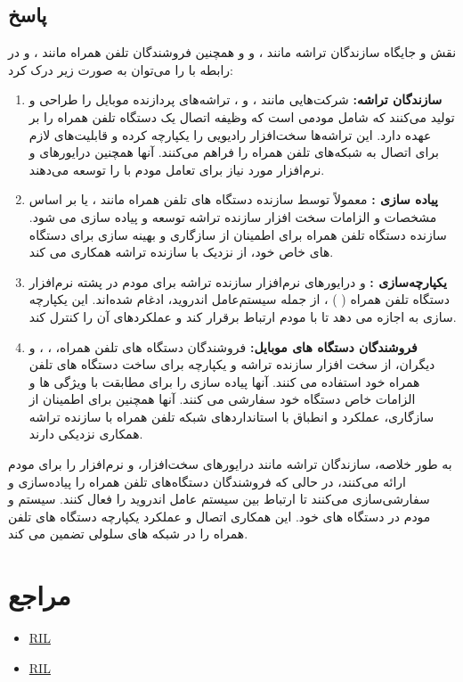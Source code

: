 \documentclass{report}
\begin{document}
\subsection*{پاسخ}
نقش و جایگاه سازندگان تراشه مانند
، 
و
 و همچنین فروشندگان تلفن همراه مانند
 ،
 و
  در رابطه با 
   را می‌توان به صورت زیر درک کرد:
\begin{enumerate}
	\item 
		\textbf{سازندگان تراشه:} 
		شرکت‌هایی مانند 
		، 
		و
		، تراشه‌های پردازنده موبایل را طراحی و تولید می‌کنند که شامل مودمی است که وظیفه اتصال 
		 یک دستگاه تلفن همراه را بر عهده دارد. این تراشه‌ها سخت‌افزار رادیویی را یکپارچه کرده و قابلیت‌های لازم برای اتصال به شبکه‌های تلفن همراه را فراهم می‌کنند. آنها همچنین درایورهای 
		  و نرم‌افزار مورد نیاز برای تعامل مودم با
		    را توسعه می‌دهند.
	\item 
	\textbf{پیاده سازی
	 :}
	 معمولاً توسط سازنده دستگاه های تلفن همراه مانند 
	 ،
	 یا
	  بر اساس مشخصات و الزامات سخت افزار سازنده تراشه توسعه و پیاده سازی می شود. سازنده دستگاه تلفن همراه برای اطمینان از سازگاری و بهینه سازی 
	   برای دستگاه های خاص خود، از نزدیک با سازنده تراشه همکاری می کند.
	   
	   \item 
	   \textbf{یکپارچه‌سازی
	    :}
	     و درایورهای نرم‌افزار سازنده تراشه برای مودم در پشته نرم‌افزار دستگاه تلفن همراه
	     (
	     )
	     ، از جمله سیستم‌عامل اندروید، ادغام شده‌اند. این یکپارچه سازی به 
	      اجازه می دهد تا با مودم ارتباط برقرار کند و عملکردهای آن را کنترل کند.
\item 
\textbf{فروشندگان دستگاه های موبایل:} 
فروشندگان دستگاه های تلفن همراه، 
،
،
 و دیگران، از سخت افزار سازنده تراشه و 
  یکپارچه برای ساخت دستگاه های تلفن همراه خود استفاده می کنند. آنها پیاده سازی
    را برای مطابقت با ویژگی ها و الزامات خاص دستگاه خود سفارشی می کنند. آنها همچنین برای اطمینان از سازگاری، عملکرد و انطباق با استانداردهای شبکه تلفن همراه با سازنده تراشه همکاری نزدیکی دارند.
\end{enumerate}

به طور خلاصه، سازندگان تراشه مانند درایورهای سخت‌افزار، 
 و نرم‌افزار را برای مودم ارائه می‌کنند، در حالی که فروشندگان دستگاه‌های تلفن همراه
   را پیاده‌سازی و سفارشی‌سازی می‌کنند تا ارتباط بین سیستم عامل اندروید را فعال کنند. سیستم و مودم در دستگاه های خود. این همکاری اتصال و عملکرد یکپارچه دستگاه های تلفن همراه را در شبکه های سلولی تضمین می کند.


\section* {مراجع}
\begin{itemize}
	\item 
	\href{https://www.oreilly.com/library/view/android-hackers-handbook/9781118608647/9781118922255c11.xhtml} {RIL}
	\item 
	\href{https://en.wikipedia.org/wiki/Radio_Interface_Layer} {RIL}
	
\end{itemize}
\end{document}
